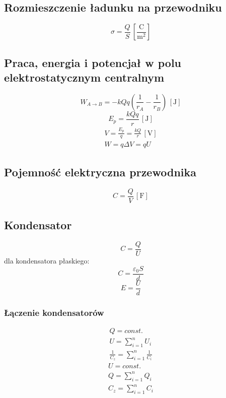 \documentclass{article}
\numberwithin{equation}{section}
\newcommand{\unit}[1]{\, \left[\mathrm{#1}\right]}
\begin{document}
    \subsection{Rozmieszczenie ładunku na przewodniku}
      \begin{equation}
        \sigma = \frac{Q}{S} \unit{\frac{C}{m^2}}
      \end{equation}
    \subsection{Praca, energia i potencjał w polu elektrostatycznym centralnym}
      \begin{equation}
        W_{A\rightarrow B} = -kQq\left(\frac{1}{r_A} - \frac{1}{r_B}\right) \unit{J}
      \end{equation}
      \begin{equation}
        E_p = \frac{kQq}{r} \unit{J}
      \end{equation}
      \begin{gather}
        V = \frac{E_p}{q} = \frac{kQ}{r} \unit{V}\\
        W = q\Delta V = qU
      \end{gather}
    \subsection{Pojemność elektryczna przewodnika}
      \begin{equation}
        C = \frac{Q}{V} \unit{F}
      \end{equation}
    \subsection{Kondensator}
      \begin{equation}
        C= \frac{Q}{U}
      \end{equation}
      dla kondensatora płaskiego:
      \begin{equation}
        C= \frac{\varepsilon_0S}{d}
      \end{equation}
      \begin{equation}
        E = \frac{U}{d}
      \end{equation}
      \subsubsection{Łączenie kondensatorów}
        \begin{gather}
          Q = const.\\
          U = \sum_{i=1}^n U_i\\
          \frac{1}{C_z} = \sum_{i=1}^n \frac{1}{C_i}
        \end{gather}
        \begin{gather}
          U = const.\\
          Q = \sum_{i=1}^n Q_i\\
          C_z = \sum_{i=1}^n C_i
        \end{gather}
\end{document}
